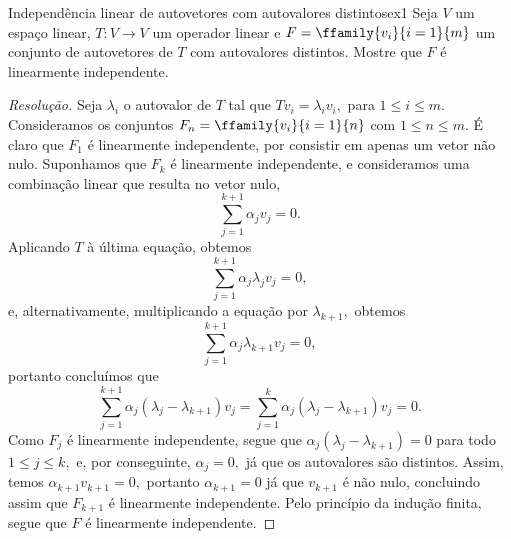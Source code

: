 \begin{exercício}{Independência linear de autovetores com autovalores distintos}{ex1}
  Seja \(V\) um espaço linear, \(T : V\to V\) um operador linear e \(F = \ffamily{v_i}{i = 1}{m}\) um conjunto de autovetores de \(T\) com autovalores distintos. Mostre que \(F\) é linearmente independente.
\end{exercício}
\begin{proof}[Resolução]
  Seja \(\lambda_i\) o autovalor de \(T\) tal que \(T v_i = \lambda_i v_i,\) para \(1 \leq i \leq m.\) Consideramos os conjuntos \(F_n = \ffamily{v_i}{i = 1}{n}\) com \(1 \leq n \leq m\). É claro que \(F_1\) é linearmente independente, por consistir em apenas um vetor não nulo. Suponhamos que \(F_k\) é linearmente independente, e consideramos uma combinação linear que resulta no vetor nulo,
  \begin{equation*}
    \sum_{j = 1}^{k+1} \alpha_j v_j = 0.
  \end{equation*}
  Aplicando \(T\) à última equação, obtemos
  \begin{equation*}
    \sum_{j = 1}^{k+1} \alpha_j \lambda_j v_j = 0,
  \end{equation*}
  e, alternativamente, multiplicando a equação por \(\lambda_{k+1},\) obtemos
  \begin{equation*}
    \sum_{j = 1}^{k+1} \alpha_j \lambda_{k+1} v_j = 0,
  \end{equation*}
  portanto concluímos que
  \begin{equation*}
    \sum_{j=1}^{k+1} \alpha_j (\lambda_j - \lambda_{k+1}) v_j = \sum_{j=1}^{k} \alpha_j (\lambda_j - \lambda_{k+1}) v_j = 0.
  \end{equation*}
  Como \(F_j\) é linearmente independente, segue que \(\alpha_j (\lambda_j - \lambda_{k+1}) = 0\) para todo \(1 \leq j \leq k,\) e, por conseguinte, \(\alpha_j = 0,\) já que os autovalores são distintos. Assim, temos \(\alpha_{k+1} v_{k+1} = 0,\) portanto \(\alpha_{k+1} = 0\) já que \(v_{k+1}\) é não nulo, concluindo assim que \(F_{k+1}\) é linearmente independente. Pelo princípio da indução finita, segue que \(F\) é linearmente independente.
\end{proof}
